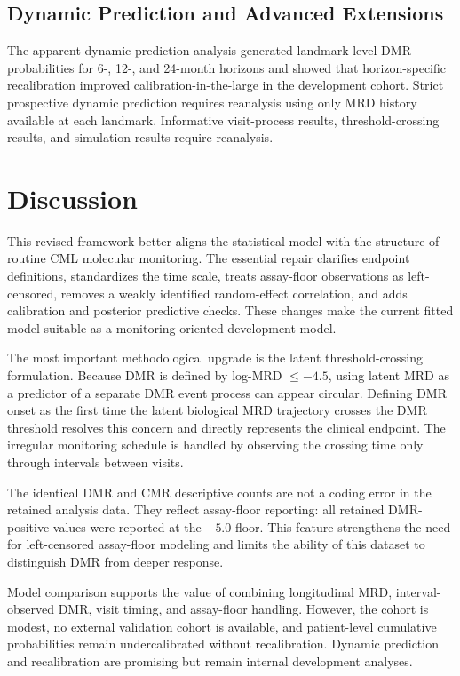 \subsection{Dynamic Prediction and Advanced Extensions}

The apparent dynamic prediction analysis generated landmark-level DMR probabilities for 6-, 12-, and 24-month horizons and showed that horizon-specific recalibration improved calibration-in-the-large in the development cohort. Strict prospective dynamic prediction requires reanalysis using only MRD history available at each landmark. Informative visit-process results, threshold-crossing results, and simulation results require reanalysis.

\section{Discussion}

This revised framework better aligns the statistical model with the structure of routine CML molecular monitoring. The essential repair clarifies endpoint definitions, standardizes the time scale, treats assay-floor observations as left-censored, removes a weakly identified random-effect correlation, and adds calibration and posterior predictive checks. These changes make the current fitted model suitable as a monitoring-oriented development model.

The most important methodological upgrade is the latent threshold-crossing formulation. Because DMR is defined by log-MRD \(\le -4.5\), using latent MRD as a predictor of a separate DMR event process can appear circular. Defining DMR onset as the first time the latent biological MRD trajectory crosses the DMR threshold resolves this concern and directly represents the clinical endpoint. The irregular monitoring schedule is handled by observing the crossing time only through intervals between visits.

The identical DMR and CMR descriptive counts are not a coding error in the retained analysis data. They reflect assay-floor reporting: all retained DMR-positive values were reported at the \(-5.0\) floor. This feature strengthens the need for left-censored assay-floor modeling and limits the ability of this dataset to distinguish DMR from deeper response.

Model comparison supports the value of combining longitudinal MRD, interval-observed DMR, visit timing, and assay-floor handling. However, the cohort is modest, no external validation cohort is available, and patient-level cumulative probabilities remain undercalibrated without recalibration. Dynamic prediction and recalibration are promising but remain internal development analyses.

